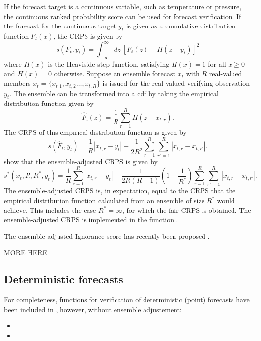 \documentclass[article]{jss}
\begin{document}
If the forecast target is a continuous variable, such as temperature or pressure, the continuous ranked probability score \citep{matheson1976scoring} can be used for forecast verification.
If the forecast for the continuous target $y_t$ is given as a cumulative distribution function $F_t(x)$, the CRPS is given by 
%
\begin{equation}
s(F_t, y_t) = \int_{-\infty}^\infty dz\ \left[F_t(z) - H(z-y_t)\right]^2
\end{equation}
%
where $H(x)$ is the Heaviside step-function, satisfying $H(x)=1$ for all $x\ge 0$ and $H(x)=0$ otherwise.
Suppose an ensemble forecast $x_t$ with $R$ real-valued members $x_t = \{x_{t,1}, x_{t,2} \dots, x_{t,R}\}$ is issued for the real-valued verifying observation $y_t$.
The ensemble can be transformed into a cdf by taking the empirical distribution function given by 
%
\begin{equation}
\hat{F}_t(z) = \frac{1}{R} \sum_{r=1}^{R} H(z - x_{t,r}).
\end{equation}
%
The CRPS of this empirical distribution function is given by
%
\begin{equation}
s(\hat{F}_t, y_t) = \frac{1}{R}|x_{t,r}-y_t| - \frac{1}{2R^2} \sum_{r=1}^R \sum_{r'=1}^R |x_{t,r}-x_{t,r'}|.
\end{equation}
%
\citet{fricker2013three} show that the ensemble-adjusted CRPS is given by
%
\begin{equation}
s^*(x_t, R, R^*, y_t) = \frac{1}{R}\sum_{r=1}^R |x_{t,r} - y_t| - \frac{1}{2R(R-1)}\left(1-\frac{1}{R^*}\right) \sum_{r=1}^R\sum_{r'=1}^R |x_{t,r}-x_{t,r'}|.
\end{equation}
%
The ensemble-adjusted CRPS is, in expectation, equal to the CRPS that the empirical distribution function calculated from an ensemble of size $R^*$ would achieve.
This includes the case $R^*=\infty$, for which the fair CRPS is obtained.
The ensemble-adjusted CRPS is implemented in the  function .



The ensemble adjusted Ignorance score has recently been proposed \citep{siegert2015ignorance}.

MORE HERE


\subsection{Deterministic forecasts}


For completeness, functions for verification of deterministic (point) forecasts have been included in , however, without ensemble adjustement:
\begin{itemize}
\item {}
\item {}
\end{itemize}
\end{document}
